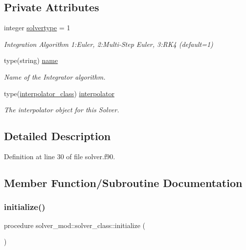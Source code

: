 \subsection*{Private Attributes}
\begin{DoxyCompactItemize}
\item 
integer \mbox{\hyperlink{structsolver__mod_1_1solver__class_a6bd9eec5b3a11d34981b191b54944ac4}{solvertype}} = 1
\begin{DoxyCompactList}\small\item\em Integration Algorithm 1\+:Euler, 2\+:Multi-\/\+Step Euler, 3\+:R\+K4 (default=1) \end{DoxyCompactList}\item 
type(string) \mbox{\hyperlink{structsolver__mod_1_1solver__class_a0a2677f8e0403b82095b826378f9439d}{name}}
\begin{DoxyCompactList}\small\item\em Name of the Integrator algorithm. \end{DoxyCompactList}\item 
type(\mbox{\hyperlink{structinterpolator__mod_1_1interpolator__class}{interpolator\+\_\+class}}) \mbox{\hyperlink{structsolver__mod_1_1solver__class_af973ac0cafba3b94744399ae41a984ee}{interpolator}}
\begin{DoxyCompactList}\small\item\em The interpolator object for this Solver. \end{DoxyCompactList}\end{DoxyCompactItemize}


\subsection{Detailed Description}


Definition at line 30 of file solver.\+f90.



\subsection{Member Function/\+Subroutine Documentation}
\mbox{\label{structsolver__mod_1_1solver__class_a9ac72acd3e4fbb8881c7eaabe9e3d585}} 
\subsubsection{\texorpdfstring{initialize()}{initialize()}}
{\footnotesize\ttfamily procedure solver\+\_\+mod\+::solver\+\_\+class\+::initialize (\begin{DoxyParamCaption}{ }\end{DoxyParamCaption})\hspace{0.3cm}{\ttfamily [private]}}



